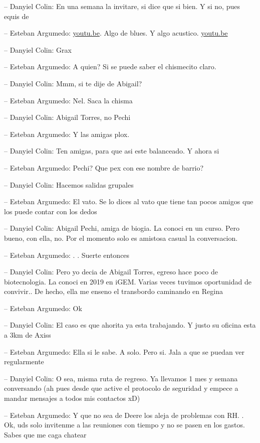 -- Danyiel Colin: En una semana la invitare, si dice que si bien. Y si
no, pues equis de

-- Esteban Argumedo: \href{https://youtu.be/-CmNDuyIEj8}{youtu.be}. Algo
de blues. Y algo acustico. \href{https://youtu.be/Cjt_xykR2Ms}{youtu.be}

-- Danyiel Colin: Grax

-- Esteban Argumedo: A quien? Si se puede saber el chismecito claro.

-- Danyiel Colin: Mmm, si te dije de Abigail?

-- Esteban Argumedo: Nel. Saca la chisma

-- Danyiel Colin: Abigail Torres, no Pechi

-- Esteban Argumedo: Y las amigas plox.

-- Danyiel Colin: Ten amigas, para que asi este balanceado. Y ahora si

-- Esteban Argumedo: Pechi? Que pex con ese nombre de barrio?

-- Danyiel Colin: Hacemos salidas grupales

-- Esteban Argumedo: El vato. Se lo dices al vato que tiene tan pocos
amigos que los puede contar con los dedos

-- Danyiel Colin: Abigail Pechi, amiga de biogia. La conoci en un curso.
Pero bueno, con ella, no. Por el momento solo es amistosa casual la
conversacion.

-- Esteban Argumedo: . . Suerte entonces

-- Danyiel Colin: Pero yo decia de Abigail Torres, egreso hace poco de
biotecnologia. La conoci en 2019 en iGEM. Varias veces tuvimos
oportunidad de convivir.. De hecho, ella me enseno el transbordo
caminando en Regina

-- Esteban Argumedo: Ok

-- Danyiel Colin: El caso es que ahorita ya esta trabajando. Y justo su
oficina esta a 3km de Axiss

-- Esteban Argumedo: Ella si le sabe. A solo. Pero si. Jala a que se
puedan ver regularmente

-- Danyiel Colin: O sea, misma ruta de regreso. Ya llevamos 1 mes y
semana conversando (ah pues desde que active el protocolo de seguridad y
empece a mandar mensajes a todos mis contactos xD)

-- Esteban Argumedo: Y que no sea de Deere los aleja de problemas con
RH. . Ok, uds solo invitenme a las reuniones con tiempo y no se pasen en
los gastos. Sabes que me caga chatear

